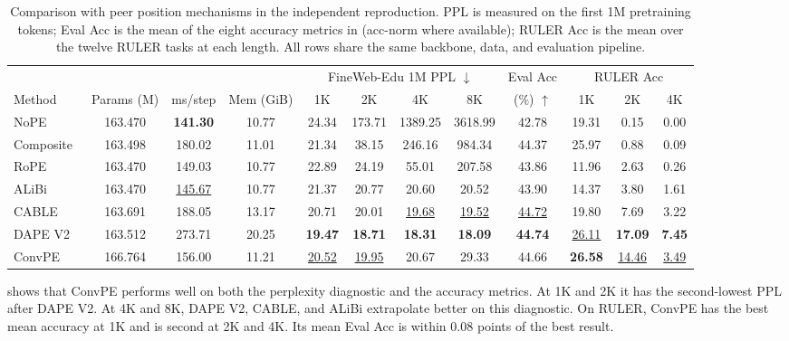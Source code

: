 \documentclass{article}
\begin{document}
\begin{table}[!ht]
\centering
\small
\setlength{\tabcolsep}{3.2pt}
\begin{tabular}{lccccccccccc}
\toprule
& & & & \multicolumn{4}{c}{FineWeb-Edu 1M PPL $\downarrow$} & Eval Acc & \multicolumn{3}{c}{RULER Acc} \\
\cmidrule(lr){5-8}\cmidrule(lr){10-12}
Method & Params (M) & ms/step & Mem (GiB) & 1K & 2K & 4K & 8K & (\%) $\uparrow$ & 1K & 2K & 4K \\
\midrule
NoPE~\cite{kazemnejad2023impact}      & 163.470 & \textbf{141.30} & 10.77 & 24.34 & 173.71 & 1389.25 & 3618.99 & 42.78 & 19.31 & 0.15 & 0.00 \\
Composite~\cite{chang2021convolutionsselfattentionreinterpretingrelative} & 163.498 & 180.02 & 11.01 & 21.34 & 38.15 & 246.16 & 984.34 & 44.37 & 25.97 & 0.88 & 0.09 \\
RoPE~\cite{su2021roformer}      & 163.470 & 149.03 & 10.77 & 22.89 & 24.19 & 55.01 & 207.58 & 43.86 & 11.96 & 2.63 & 0.26 \\
ALiBi~\cite{press2021train}      & 163.470 & \underline{145.67} & 10.77 & 21.37 & 20.77 & 20.60 & 20.52 & 43.90 & 14.37 & 3.80 & 1.61 \\
CABLE~\cite{veisi2025cable}      & 163.691 & 188.05 & 13.17 & 20.71 & 20.01 & \underline{19.68} & \underline{19.52} & \underline{44.72} & 19.80 & 7.69 & 3.22 \\
DAPE V2~\cite{zheng2025dapev2}      & 163.512 & 273.71 & 20.25 & \textbf{19.47} & \textbf{18.71} & \textbf{18.31} & \textbf{18.09} & \textbf{44.74} & \underline{26.11} & \textbf{17.09} & \textbf{7.45} \\
ConvPE    & 166.764 & 156.00 & 11.21 & \underline{20.52} & \underline{19.95} & 20.67 & 29.33 & 44.66 & \textbf{26.58} & \underline{14.46} & \underline{3.49} \\
\bottomrule
\end{tabular}
\caption{Comparison with peer position mechanisms in the independent reproduction. PPL is measured on the first 1M pretraining tokens; Eval Acc is the mean of the eight accuracy metrics in  (acc-norm where available); RULER Acc is the mean over the twelve RULER tasks at each length. All rows share the same backbone, data, and evaluation pipeline.}
\label{tab:lm-summary}
\end{table}

 shows that ConvPE performs well on both the perplexity diagnostic and the accuracy metrics. At 1K and 2K it has the second-lowest PPL after DAPE V2. At 4K and 8K, DAPE V2, CABLE, and ALiBi extrapolate better on this diagnostic. On RULER, ConvPE has the best mean accuracy at 1K and is second at 2K and 4K. Its mean Eval Acc is within $0.08$ points of the best result. 
\end{document}
